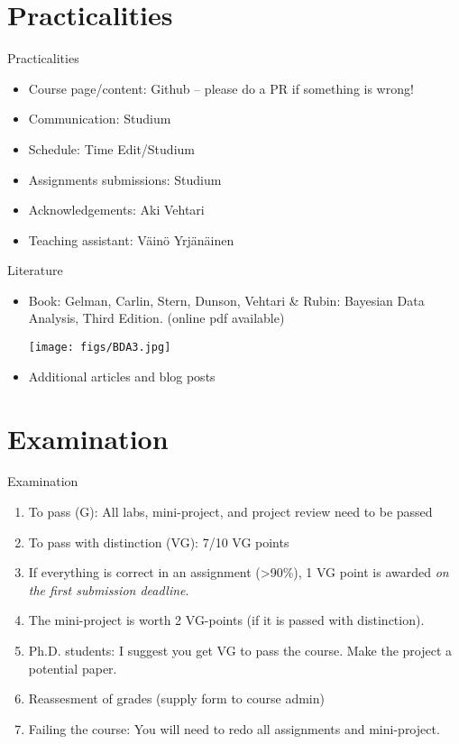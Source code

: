\documentclass[10pt]{beamer}
\begin{document}
\section{Practicalities}
\frame{\sectionpage}

\begin{frame}{Practicalities}

\begin{itemize}
\item Course page/content: Github -- please do a PR if something is wrong!\pause
\item Communication: Studium\pause
\item Schedule: Time Edit/Studium
\item Assignments submissions: Studium\pause
\item Acknowledgements: Aki Vehtari\pause
\item Teaching assistant: Väinö Yrjänäinen
\end{itemize}

\end{frame}

\begin{frame}{Literature}

\begin{itemize}
  \item Book: Gelman, Carlin, Stern, Dunson, Vehtari \& Rubin: Bayesian Data Analysis, Third Edition. {\footnotesize (online pdf available)}
  \begin{center}
    \texttt{[image: figs/BDA3.jpg]}
  \end{center}
  \item Additional articles and blog posts
\end{itemize}

\end{frame}

\section{Examination}
\frame{\sectionpage}


\begin{frame}{Examination}

\begin{enumerate}
\item To pass (G): All labs, mini-project, and project review need to be passed\pause
\item To pass with distinction (VG): 7/10 VG points\pause
\item If everything is correct in an assignment (>90\%), 1 VG point is awarded \emph{on the first submission deadline}.\pause
\item The mini-project is worth 2 VG-points (if it is passed with distinction).
\item Ph.D. students: I suggest you get VG to pass the course. Make the project a potential paper.
\item Reassesment of grades (supply form to course admin)
\item Failing the course: You will need to redo all assignments and mini-project.
\end{enumerate}

\end{frame}
\end{document}
